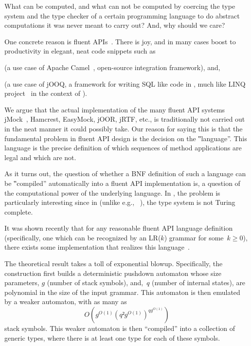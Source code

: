 What can be computed, and what can not be computed by coercing the type system
and the type checker of a certain programming language to do abstract
computations it was never meant to carry out? And, why should we care?

One concrete reason is fluent
APIs~\cite{VanDeursen:Klint:2000,Hudak:1997,Fowler:2010}.  There is joy, and in
many cases boost to productivity in elegant, neat code snippets such as
\begin{quote}
  \label{figure:DSL}
  \parbox[c]{44ex}{}
\end{quote}
(a use case of Apache Camel~\cite{Ibsen:Anstey:10}, open-source integration
framework), and,
\begin{quote}
\end{quote}
(a use case of jOOQ, a framework for writing
SQL like code in \Java, much like LINQ project~\cite{Meijer:Beckman:Bierman:06}
in the context of \CSharp).

We argue that
the actual implementation of the many fluent API systems
jMock~\cite{Freeman:Pryce:06},
Hamcrest,
EasyMock,
jOOR,
jRTF,
etc., is traditionally not carried out
in the neat manner it could possibly take.
Our reason for saying this is that the fundamental problem in
fluent API design is the decision on the ‟language”.
This language is the precise definition of which sequences of method
applications are legal and which are not.

As it turns out, the question of whether a BNF definition of such a language
can be ‟compiled” automatically into a fluent API implementation is, a
question of the computational power of the underlying language. In \Java, the problem
is particularly interesting since in \Java (unlike e.g., \CC~\cite{Gutterman:2003}),
the type system is not Turing complete.

It was shown recently that for any reasonable fluent API language definition
(specifically, one which can be recognized by an LR($k$) grammar for some~$k
≥0$), there exists some \Java implementation that realizes this
language~\cite{Gil:Levy:2016}.

The theoretical result takes a toll of exponential blowup. Specifically, the
construction first builds a deterministic pushdown automaton whose size
parameters, $g$ (number of stack symbols), and,~$q$ (number of internal
states), are polynomial in the size of the input grammar. This automaton is then
emulated by a weaker automaton, with as many as
\[
  O\left(g^{O(1)}\left(q²g^{O(1)}\right)^{qg^{O(1)}}\right)
\] 
stack symbols.
This weaker automaton is then ``compiled'' into a  collection of generic \Java types,
where there is at least one type for each of these symbols.

